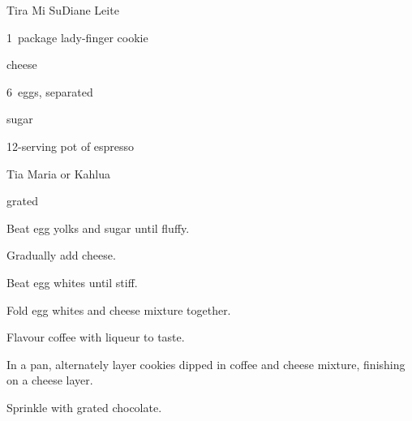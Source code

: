 \begin{recipe}{Tira Mi Su}{Diane Leite}{}

\begin{ingredients}
\item 1~package lady-finger cookie
\item {}  cheese
\item 6~eggs, separated
\item \C{\threequarter} sugar
\item 12-serving pot of espresso
\item Tia Maria or Kahlua
\item grated 
\end{ingredients}

\begin{directions}
\item Beat egg yolks and sugar until fluffy.
\item Gradually add cheese.
\item Beat egg whites until stiff.
\item Fold egg whites and cheese mixture together.
\item Flavour coffee with liqueur to taste.
\item In a pan, alternately layer cookies dipped in coffee and cheese mixture, finishing on a cheese layer.
\item Sprinkle with grated chocolate.
\end{directions}

\end{recipe}
